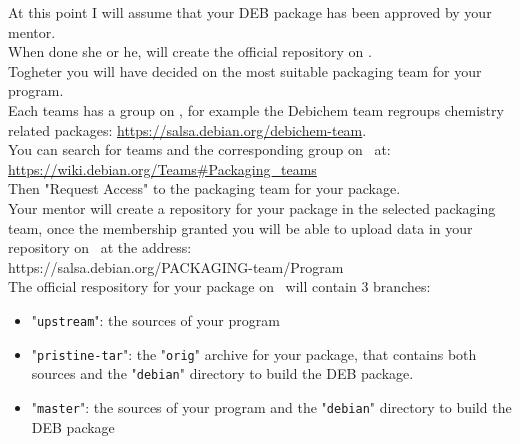 At this point I will assume that your DEB package has been approved by your mentor. \\
When done she or he, will create the official repository on \salsa. \\ 
Togheter you will have decided on the most suitable packaging team for your program. \\ 
Each teams has a group on \salsa, for example the Debichem team  
regroups chemistry related packages: \href{https://salsa.debian.org/debichem-team}{https://salsa.debian.org/debichem-team}. \\[0.25cm]
You can search for teams and the corresponding group on \salsa\ at: \\[0.25cm]
\href{https://wiki.debian.org/Teams\#Packaging\_teams}{https://wiki.debian.org/Teams\#Packaging\_teams} \\[0.25cm]
Then "Request Access" to the packaging team for your package. \\[0.25cm]
Your mentor will create a repository for your package in the selected packaging team, once the membership granted you will be able 
to upload data in your repository on \salsa\ at the address: \\[0.25cm] 
https://salsa.debian.org/PACKAGING-team/Program \\[0.25cm]
The official respository for your package on \salsa\ will contain 3 branches:
\begin{itemize}
\item "\texttt{upstream}": the sources of your program
\item "\texttt{pristine-tar}": the "\texttt{orig}" archive for your package, that contains both sources and the "\texttt{debian}" directory to build the DEB package. 
\item "\texttt{master}": the sources of your program and the "\texttt{debian}" directory to build the DEB package
\end{itemize}

\newpage

